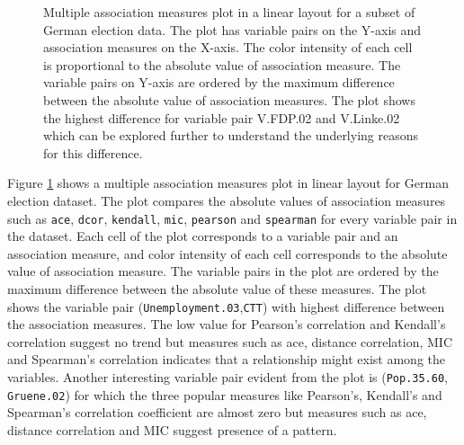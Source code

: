 \begin{Schunk}
\begin{figure}
\caption[Multiple association measures plot in a linear layout for a subset of German election data]{Multiple association measures plot in a linear layout for a subset of German election data. The plot has variable pairs on the Y-axis and association measures on the X-axis. The color intensity of each cell is proportional to the absolute value of association measure. The variable pairs on Y-axis are ordered by the maximum difference between the absolute value of association measures. The plot shows the highest difference for variable pair V.FDP.02 and V.Linke.02 which can be explored further to understand the underlying reasons for this difference.}\label{fig:compare-linear-heatmap}
\end{figure}
\end{Schunk}

Figure \ref{fig:compare-linear-heatmap} shows a multiple association
measures plot in linear layout for German election dataset. The plot
compares the absolute values of association measures such as
\texttt{ace}, \texttt{dcor}, \texttt{kendall}, \texttt{mic},
\texttt{pearson} and \texttt{spearman} for every variable pair in the
dataset. Each cell of the plot corresponds to a variable pair and an
association measure, and color intensity of each cell corresponds to the
absolute value of association measure. The variable pairs in the plot
are ordered by the maximum difference between the absolute value of
these measures. The plot shows the variable pair
(\texttt{Unemployment.03},\texttt{CTT}) with highest difference between
the association measures. The low value for Pearson's correlation and
Kendall's correlation suggest no trend but measures such as ace,
distance correlation, MIC and Spearman's correlation indicates that a
relationship might exist among the variables. Another interesting
variable pair evident from the plot is (\texttt{Pop.35.60},
\texttt{Gruene.02}) for which the three popular measures like Pearson's,
Kendall's and Spearman's correlation coefficient are almost zero but
measures such as ace, distance correlation and MIC suggest presence of a
pattern.

